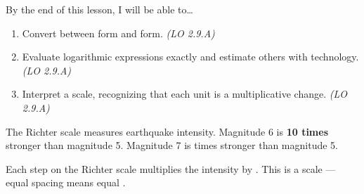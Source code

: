 \documentclass[10pt]{article}
\begin{document}
\namedateperiod

\vspace{0.04in}

\begin{objectivebox}
By the end of this lesson, I will be able to\ldots
\begin{enumerate}[itemsep=2pt]
  \item Convert between \blank{3cm} form and \blank{3cm} form. \hfill\textit{(LO 2.9.A)}
  \item Evaluate logarithmic expressions exactly and estimate others with technology. \hfill\textit{(LO 2.9.A)}
  \item Interpret a \blank{4cm} scale, recognizing that each unit is a multiplicative change. \hfill\textit{(LO 2.9.A)}
\end{enumerate}
\end{objectivebox}

\vspace{0.04in}

\begin{vocabbox}
\end{vocabbox}

\vspace{0.04in}

\begin{hookbox}
The Richter scale measures earthquake intensity. Magnitude 6 is \textbf{10 times} stronger
than magnitude 5. Magnitude 7 is \blank{3cm} times stronger than magnitude 5.

Each step on the Richter scale multiplies the intensity by \blank{2cm}.
This is a \blank{3cm} scale --- equal spacing means equal \blank{2.5cm}.
\end{hookbox}

\vspace{0.04in}
\end{document}
